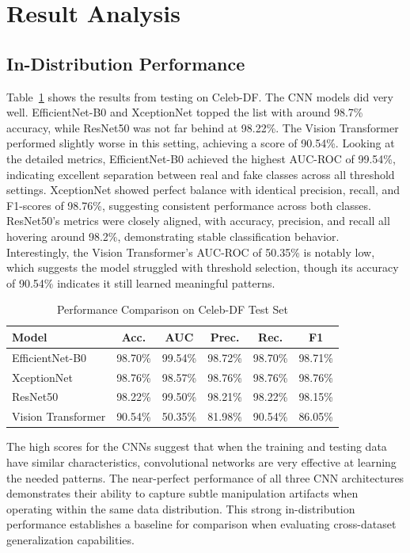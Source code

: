\documentclass[runningheads]{llncs}
\begin{document}
\section{Result Analysis}

\subsection{In-Distribution Performance}
Table~\ref{tab:celebd_results} shows the results from testing on Celeb-DF. The CNN models did very well. EfficientNet-B0 and XceptionNet topped the list with around 98.7\% accuracy, while ResNet50 was not far behind at 98.22\%. The Vision Transformer performed slightly worse in this setting, achieving a score of 90.54\%. Looking at the detailed metrics, EfficientNet-B0 achieved the highest AUC-ROC of 99.54\%, indicating excellent separation between real and fake classes across all threshold settings. XceptionNet showed perfect balance with identical precision, recall, and F1-scores of 98.76\%, suggesting consistent performance across both classes. ResNet50's metrics were closely aligned, with accuracy, precision, and recall all hovering around 98.2\%, demonstrating stable classification behavior. Interestingly, the Vision Transformer's AUC-ROC of 50.35\% is notably low, which suggests the model struggled with threshold selection, though its accuracy of 90.54\% indicates it still learned meaningful patterns.

\begin{table}[H]
\caption{Performance Comparison on Celeb-DF Test Set}
\label{tab:celebd_results}
\centering
\small
\setlength{\tabcolsep}{10pt}
\begin{tabular}{lccccc}
\toprule
\textbf{Model} & \textbf{Acc.} & \textbf{AUC} & \textbf{Prec.} & \textbf{Rec.} & \textbf{F1} \\
\midrule
EfficientNet-B0 & 98.70\% & 99.54\% & 98.72\% & 98.70\% & 98.71\% \\
XceptionNet & 98.76\% & 98.57\% & 98.76\% & 98.76\% & 98.76\% \\
ResNet50 & 98.22\% & 99.50\% & 98.21\% & 98.22\% & 98.15\% \\
Vision Transformer & 90.54\% & 50.35\% & 81.98\% & 90.54\% & 86.05\% \\
\bottomrule
\end{tabular}
\end{table}

The high scores for the CNNs suggest that when the training and testing data have similar characteristics, convolutional networks are very effective at learning the needed patterns. The near-perfect performance of all three CNN architectures demonstrates their ability to capture subtle manipulation artifacts when operating within the same data distribution. This strong in-distribution performance establishes a baseline for comparison when evaluating cross-dataset generalization capabilities.
\end{document}
